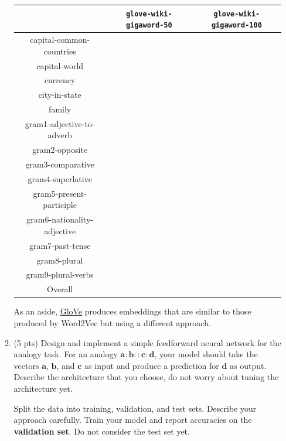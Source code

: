 \documentclass{article}
\begin{document}
\begin{enumerate}
\begin{enumerate}
        \begin{center}
            \hspace*{-1cm}\begin{tabular}{c||c|c|}
             & \texttt{glove-wiki-gigaword-50} & \texttt{glove-wiki-gigaword-100} \\ \hline \hline
            capital-common-countries & & \\ \hline
            capital-world & & \\ \hline
            currency & & \\ \hline
            city-in-state & & \\ \hline
            family & & \\ \hline
            gram1-adjective-to-adverb & & \\ \hline
            gram2-opposite & & \\ \hline
            gram3-comparative & & \\ \hline
            gram4-superlative & & \\ \hline
            gram5-present-participle & & \\ \hline
            gram6-nationality-adjective & & \\ \hline
            gram7-past-tense & & \\ \hline
            gram8-plural & & \\ \hline
            gram9-plural-verbs & & \\ \hline
            Overall & & \\ \hline
            \end{tabular}
        \end{center}

        As an aside, \href{https://nlp.stanford.edu/pubs/glove.pdf}{GloVe} produces embeddings that are similar to those produced by Word2Vec but using a different approach.
        
        \item (5 pts) Design and implement a simple feedforward neural network for the analogy task. For an analogy $\mathbf{a}:\mathbf{b}::\mathbf{c}:\mathbf{d}$, your model should take the vectors $\mathbf{a}$, $\mathbf{b}$, and $\mathbf{c}$ as input and produce a prediction for $\mathbf{d}$ as output. Describe the architecture that you choose, do not worry about tuning the architecture yet.
        
        Split the data into training, validation, and test sets. Describe your approach carefully. Train your model and report accuracies on the \textbf{validation set}. Do not consider the test set yet.


\end{enumerate}
\end{enumerate}
\end{document}
